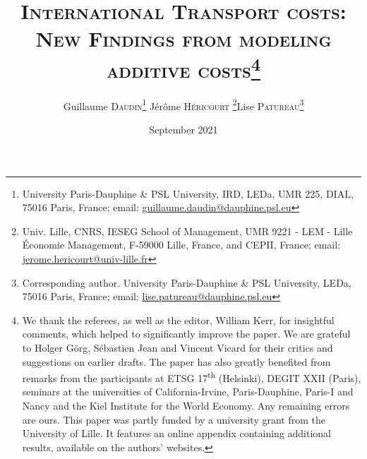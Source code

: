 \documentclass[a4paper,11pt]{article}
\begin{document}
\title{\textsc{International Transport costs:\\New Findings from modeling additive costs}\thanks{We thank the referees, as well as the editor, William Kerr, for insightful comments, which helped to significantly improve the paper. We are grateful to Holger G\"{o}rg, S\'{e}bastien Jean and Vincent Vicard for their critics and suggestions on earlier drafts. The paper has also greatly benefited from remarks from the participants at ETSG 17\textsuperscript{th} (Helsinki), DEGIT XXII (Paris), seminars at the universities of California-Irvine, Paris-Dauphine, Paris-I and Nancy and the Kiel Institute for the World Economy. Any remaining errors are ours. This paper was partly funded by a university grant from the University of Lille. It features an online appendix containing additional results, available on the authors' websites.}}

\author{Guillaume \textsc{Daudin}\thanks{%
University Paris-Dauphine \& PSL University, IRD, LEDa, UMR 225, DIAL, 75016 Paris, France; email: \url{guillaume.daudin@dauphine.psl.eu}}  \qquad J\'{e}r\^{o}me \textsc{H\'{e}ricourt} \thanks{Univ. Lille, CNRS, IESEG School of Management, UMR 9221 - LEM - Lille Économie Management, F-59000 Lille, France, and CEPII, France; email: \url{jerome.hericourt@univ-lille.fr}}\qquad Lise \textsc{Patureau}\thanks{Corresponding author.
University Paris-Dauphine \& PSL University, LEDa, 75016 Paris, France;  email: \url{lise.patureau@dauphine.psl.eu} } }


\date{September 2021}
 \maketitle
\bigskip
\end{document}
